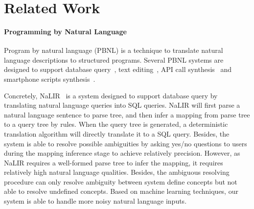\section{Related Work}


\paragraph{Programming by Natural Language} Program by natural language (PBNL) is a technique to translate natural language descriptions to structured programs. Several PBNL systems are designed to support database query~\cite{DBLP:conf/sigmod/GulwaniM14, DBLP:journals/tods/LiYJ07, DBLP:journals/pvldb/LiJ14}, text editing~\cite{DBLP:journals/corr/DesaiGHJKMRR15}, API call synthesis~\cite{DBLP:journals/corr/RaghothamanWH15} and smartphone scripts synthesis~\cite{DBLP:conf/mobisys/LeGS13}.

Concretely, NaLIR~\cite{DBLP:journals/pvldb/LiJ14} is a system designed to support database query by translating natural language queries into SQL queries. NaLIR will first parse a natural language sentence to parse tree, and then infer a mapping from parse tree to a query tree by rules. When the query tree is generated, a deterministic translation algorithm will directly translate it to a SQL query. Besides, the system is able to resolve possible ambiguities by asking yes/no questions to users during the mapping inference stage to achieve relatively precision. However, as NaLIR requires a well-formed parse tree to infer the mapping, it requires relatively high natural language qualities. Besides, the ambiguous resolving procedure can only resolve ambiguity between system define concepts but not able to resolve undefined concepts. Based on machine learning techniques, our system is able to handle more noisy natural language inputs.

